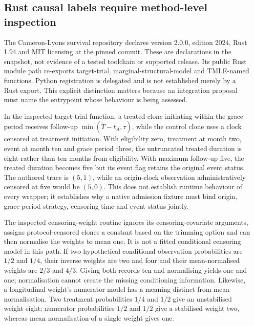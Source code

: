 \subsection{Rust causal labels require method-level inspection}
The Cameron-Lyons survival repository declares version 2.0.0, edition 2024,
Rust 1.94 and MIT licensing at the pinned commit. These are declarations in the
snapshot, not evidence of a tested toolchain or supported release. Its public Rust
module path re-exports target-trial, marginal-structural-model and TMLE-named
functions. Python registration is delegated and is not established merely by a
Rust export. This explicit distinction matters because an integration proposal must
name the entrypoint whose behaviour is being assessed.~\citep{exec24_survivalother_rustcore}

In the inspected target-trial function, a treated clone initiating within the grace
period receives follow-up $\min(\widetilde T-t_A,\tau)$, while the control clone
uses a clock censored at treatment initiation. With eligibility zero, treatment at
month two, event at month ten and grace period three, the untruncated treated duration
is eight rather than ten months from eligibility. With maximum follow-up five, the
treated duration becomes five but its event flag retains the original event status.
The authored trace is $(5,1)$, while an origin-clock observation administratively
censored at five would be $(5,0)$. This does not establish runtime behaviour of
every wrapper; it establishes why a native admission fixture must bind origin,
grace-period strategy, censoring time and event status jointly.
\citep{exec24_survivalother_rustcore,exec24_survivalother_reference}

The inspected censoring-weight routine ignores its censoring-covariate arguments,
assigns protocol-censored clones a constant based on the trimming option and can
then normalise the weights to mean one. It is not a fitted conditional censoring
model in this path. If two hypothetical conditional observation probabilities are
$1/2$ and $1/4$, their inverse weights are two and four and their mean-normalised
weights are $2/3$ and $4/3$. Giving both records ten and normalising yields one
and one; normalisation cannot create the missing conditioning information.
Likewise, a longitudinal weight's numerator model has a meaning distinct from mean
normalisation. Two treatment probabilities $1/4$ and $1/2$ give an unstabilised
weight eight; numerator probabilities $1/2$ and $1/2$ give a stabilised weight two,
whereas mean normalisation of a single weight gives one.
\citep{exec24_survivalother_rustcore,exec24_survivalother_reference}

